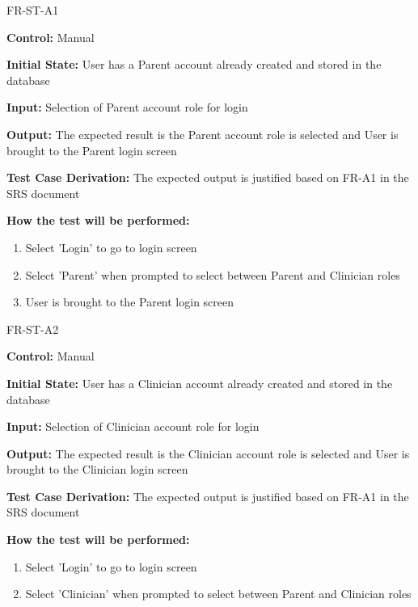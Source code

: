 \documentclass[12pt, titlepage]{article}
\begin{document}
\begin{itemize}
  \begin{item}
      FR-ST-A1
      \begin{mdframed}[linewidth=0.5mm]
          \textbf{Control:} Manual \par
          \textbf{Initial State:} User has a Parent account already created and stored in the database \par
          \textbf{Input:} Selection of Parent account role for login \par
          \textbf{Output:} The expected result is the Parent account role is selected and User is brought to the Parent login screen \par
          \textbf{Test Case Derivation:} The expected output is justified based on FR-A1 in the SRS document \par
          \textbf{How the test will be performed:}
          \begin{enumerate}[noitemsep]
            \item Select 'Login' to go to login screen
            \item Select 'Parent' when prompted to select between Parent and Clinician roles
            \item User is brought to the Parent login screen
          \end{enumerate}
      \end{mdframed}
  \end{item}
  \begin{item}
    FR-ST-A2
    \begin{mdframed}[linewidth=0.5mm]
      \textbf{Control:} Manual \par
      \textbf{Initial State:} User has a Clinician account already created and stored in the database \par
      \textbf{Input:} Selection of Clinician account role for login \par
      \textbf{Output:} The expected result is the Clinician account role is selected and User is brought to the Clinician login screen \par
      \textbf{Test Case Derivation:} The expected output is justified based on FR-A1 in the SRS document \par
      \textbf{How the test will be performed:}
      \begin{enumerate}[noitemsep]
        \item Select 'Login' to go to login screen
        \item Select 'Clinician' when prompted to select between Parent and Clinician roles

\end{enumerate}
\end{mdframed}
\end{item}
\end{itemize}
\end{document}
